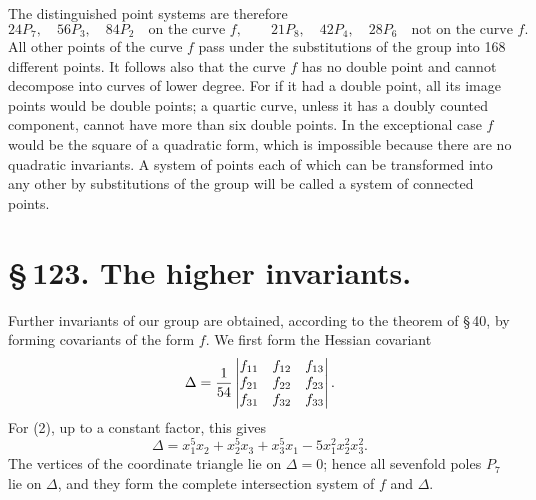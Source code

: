 \documentclass[11pt]{article}
\begin{document}
The distinguished point systems are therefore
\begin{equation}
24P_7,
\quad 56P_3,
\quad 84P_2\quad\text{on the curve }f,
\qquad
21P_8,
\quad42P_4,
\quad28P_6\quad\text{not on the curve }f.
\end{equation}
All other points of the curve \(f\) pass under the substitutions of the group into 168 different points. It follows also that the curve \(f\) has no double point and cannot decompose into curves of lower degree. For if it had a double point, all its image points would be double points; a quartic curve, unless it has a doubly counted component, cannot have more than six double points. In the exceptional case \(f\) would be the square of a quadratic form, which is impossible because there are no quadratic invariants. A system of points each of which can be transformed into any other by substitutions of the group will be called a system of connected points.

\section*{\S\,123. The higher invariants.}

Further invariants of our group are obtained, according to the theorem of \S\,40, by forming covariants of the form \(f\). We first form the Hessian covariant
\begin{equation}
\Delta={1\over54}
\begin{vmatrix}
f_{11}&f_{12}&f_{13}\\
f_{21}&f_{22}&f_{23}\\
f_{31}&f_{32}&f_{33}
\end{vmatrix}.
\end{equation}
For (2), up to a constant factor, this gives
\begin{equation}
\Delta=x_1^5x_2+x_2^5x_3+x_3^5x_1-5x_1^2x_2^2x_3^2.
\tag{3}
\end{equation}
The vertices of the coordinate triangle lie on \(\Delta=0\); hence all sevenfold poles \(P_7\) lie on \(\Delta\), and they form the complete intersection system of \(f\) and \(\Delta\).
\end{document}
